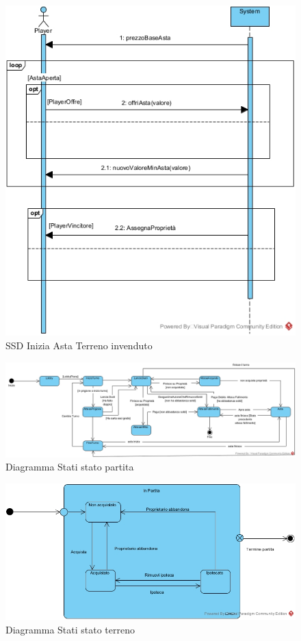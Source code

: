 \documentclass{article}
\begin{document}
\begin{figure}[H]
\centering
\includegraphics[width=\textwidth]{SSD_IniziaAsta_Invenduta}
\caption{SSD Inizia Asta Terreno invenduto}
\end{figure}


\begin{figure}[H]
\centering
\includegraphics[width=\textwidth]{DiagrammaStatiStatoPartita}
\caption{Diagramma Stati stato partita}
\end{figure}

\begin{figure}[H]
\centering
\includegraphics[width=\textwidth]{DiagrammaStatiStatoTerreno}
\caption{Diagramma Stati stato terreno}
\end{figure}
\end{document}
